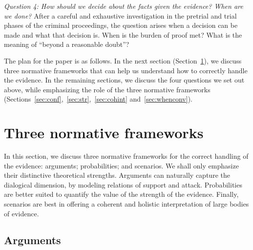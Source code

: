 \documentclass[10pt]{article}
\begin{document}

\textit{Question 4:	How should we decide about the facts given the evidence? When are we done?}
After a careful and exhaustive investigation in the pretrial and trial phases of the criminal proceedings, the question arises when a decision can be made and what that decision is. When is the burden of proof met? What is the meaning of ``beyond a reasonable doubt''? %

\vspace{1em}
\noindent
The plan for the paper is as follows. In the next section (Section~\ref{sec:frameworks}), we discuss three normative frameworks 
that can help us understand how to correctly handle the evidence. %
In the remaining sections, we discuss the four questions we set out above, while emphasizing 
the role of the three normative frameworks (Sections~\ref{sec:conf},~\ref{sec:str},~\ref{sec:cohint} and~\ref{sec:whenconv}). 




\section{Three normative frameworks}
\label{sec:frameworks}

In this section, we discuss three normative frameworks for the correct handling of the evidence: 
arguments; probabilities; and scenarios. %
We shall only emphasize their distinctive theoretical strengths. Arguments can naturally 
capture the dialogical dimension, by modeling relations of support and attack. 
Probabilities are better suited to quantify the value of the strength of the evidence. Finally, scenarios are 
best in offering a coherent and holistic interpretation 
of large bodies of evidence. 


\subsection{Arguments}
\end{document}
